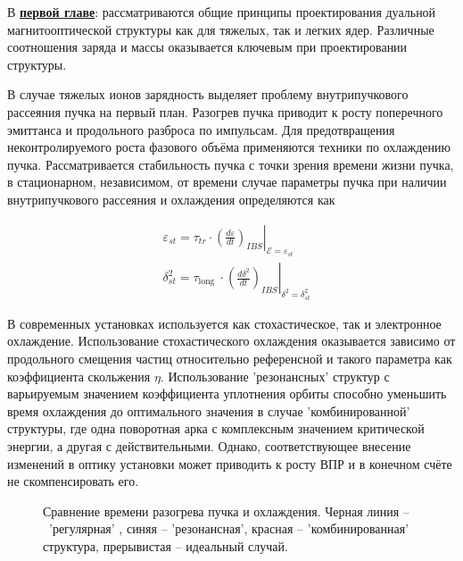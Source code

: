В \underline{\textbf{первой главе}}: рассматриваются общие принципы проектирования дуальной магнитооптической структуры как для тяжелых, так и легких ядер. Различные соотношения заряда и массы оказывается ключевым при проектировании структуры. 
\par В случае тяжелых ионов зарядность выделяет проблему внутрипучкового рассеяния пучка на первый план. Разогрев пучка приводит к росту поперечного эмиттанса и продольного разброса по импульсам. Для предотвращения неконтролируемого роста фазового объёма применяются техники по охлаждению пучка. Рассматривается стабильность пучка с точки зрения времени жизни пучка, в стационарном, независимом, от времени случае параметры пучка при наличии внутрипучкового рассеяния и охлаждения определяются как

\[
    \begin{aligned}
& \varepsilon_{s t}=\left.\tau_{t r} \cdot\left(\frac{d \varepsilon}{d t}\right)_{I B S}\right|_{\mathcal{E}=\varepsilon_{s t}} \\
& \delta_{s t}^2=\left.\tau_{\text {long }} \cdot\left(\frac{d \delta^2}{d t}\right)_{I B S}\right|_{\delta^2=\delta_{s t}^2}
\end{aligned}
\]

\noindent В современных установках используется как стохастическое, так и электронное охлаждение. Использование стохастического охлаждения оказывается зависимо от продольного смещения частиц относительно референсной и такого параметра как коэффициента скольжения $\eta$. Использование 'резонансных' структур с варьируемым значением коэффициента уплотнения орбиты способно уменьшить время охлаждения до оптимального значения в случае 'комбинированной' структуры, где одна поворотная арка с комплексным значением критической энергии, а другая с действительными. Однако, соответствующее внесение изменений в оптику установки может приводить к росту ВПР и в конечном счёте не скомпенсировать его.

\begin{figure}[ht]
    \caption{Сравнение времени разогрева пучка и охлаждения. Черная линия – 'регулярная' , синяя – 'резонансная', красная – 'комбинированная' структура, прерывистая – идеальный случай.}\label{fig:latex}
\end{figure}

